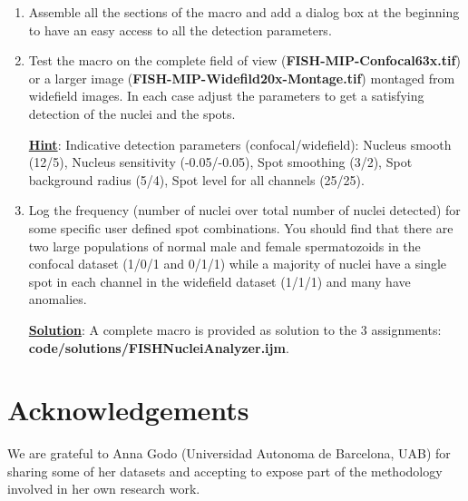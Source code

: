 \documentclass[11pt,a4paper,oneside]{report}
\begin{document}
\begin{enumerate}
\item Assemble all the sections of the macro and add a dialog box at the beginning to have an easy access to all the detection parameters.
 
\item Test the macro on the complete field of view (\textbf{FISH-MIP-Confocal63x.tif}) or a larger image (\textbf{FISH-MIP-Widefild20x-Montage.tif}) montaged from widefield images. In each case adjust the parameters to get a satisfying detection of the nuclei and the spots.

\textbf{\underline{Hint}}: Indicative detection parameters (confocal/widefield): Nucleus smooth (12/5), Nucleus sensitivity (-0.05/-0.05), Spot smoothing (3/2), Spot background radius (5/4), Spot level for all channels (25/25).

\item Log the frequency (number of nuclei over total number of nuclei detected) for some specific user defined spot combinations. You should find that there are two large populations of normal male and female spermatozoids in the confocal dataset (1/0/1 and 0/1/1) while a majority of nuclei have a single spot in each channel in the widefield dataset (1/1/1) and many have anomalies.

\textbf{\underline{Solution}}: A complete macro is provided as solution to the 3 assignments: \textbf{code/solutions/FISHNucleiAnalyzer.ijm}.

\end{enumerate}


\section{Acknowledgements}
We are grateful to Anna Godo (Universidad Autonoma de Barcelona, UAB) for sharing some of her datasets and accepting to expose part of the methodology involved in her own research work.

\clearpage{}


\end{document}
